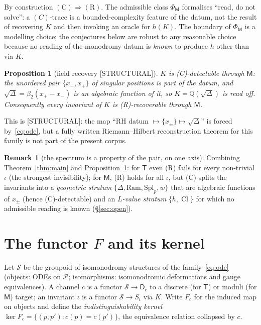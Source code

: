 \documentclass[11pt]{article}
\newtheorem{proposition}[theorem]{Proposition}
\theoremstyle{definition}
\newtheorem{remark}[theorem]{Remark}
\newcommand{\Q}{\mathbb{Q}}
\newcommand{\Cl}{\operatorname{Cl}}
\newcommand{\Dc}{\mathsf{D}}
\newcommand{\Tch}{\mathsf{T}}
\newcommand{\Mch}{\mathsf{M}}
\newcommand{\STRUCTURAL}{\textsf{[STRUCTURAL]}}
\begin{document}
By construction $(\mathrm C)\Rightarrow(\mathrm R)$. The admissible class $\Phi_\Mch$
formalises ``read, do not solve'': a $(C)$-trace is a bounded-complexity feature of the
datum, not the result of recovering $K$ and then invoking an oracle for $h(K)$. The
boundary of $\Phi_\Mch$ is a modelling choice; the conjectures below are robust to any
reasonable choice because no reading of the monodromy datum is \emph{known} to produce
$h$ other than via $K$.

\begin{proposition}[field recovery \STRUCTURAL]\label{prop:Krec}
$K$ is (C)-detectable through $\Mch$: the unordered pair $\{x_-,x_+\}$ of singular
positions is part of the datum, and $\sqrt\Delta=\beta_2(x_+-x_-)$ is an algebraic
function of it, so $K=\Q(\sqrt\Delta)$ is read off. Consequently \emph{every}
invariant of $K$ is (R)-recoverable through $\Mch$.
\end{proposition}
This is \STRUCTURAL: the map ``RH datum $\mapsto\{x_\pm\}\mapsto\sqrt\Delta$'' is
forced by~\eqref{eq:ode}, but a fully written Riemann--Hilbert reconstruction theorem
for this family is not part of the present corpus.

\begin{remark}[the spectrum is a property of the pair, on one axis]
Combining Theorem~\ref{thm:main} and Proposition~\ref{prop:Krec}: for $\Tch$ even (R)
fails for every non-trivial $\iota$ (the strongest invisibility); for $\Mch$, (R)
holds for all $\iota$, but (C) splits the invariants into a \emph{geometric stratum}
$\{\Delta,\mathrm{Ram},\mathrm{Spl}_p,w\}$ that are algebraic functions of $x_\pm$
(hence (C)-detectable) and an \emph{$L$-value stratum} $\{h,\Cl\}$ for which no
admissible reading is known (\S\ref{sec:open}).
\end{remark}

\section{The functor $F$ and its kernel}\label{sec:functor}

Let $\mathcal S$ be the groupoid of isomonodromy structures of the
family~\eqref{eq:ode} (objects: ODEs on $\mathcal P$; isomorphisms: isomonodromic
deformations and gauge equivalences). A channel $c$ is a functor $\mathcal S\to
\Dc_c$ to a discrete (for $\Tch$) or moduli (for $\Mch$) target; an invariant
$\iota$ is a functor $\mathcal S\to S_\iota$ via $K$. Write $F_c$ for the induced map
on objects and define the \emph{indistinguishability kernel}
$\ker F_c=\{(p,p'):c(p)=c(p')\}$, the equivalence relation collapsed by $c$.
\end{document}
